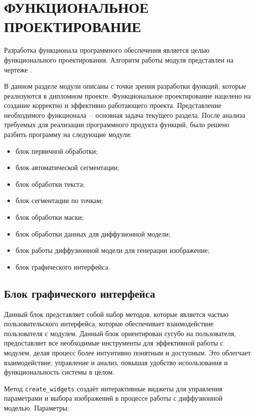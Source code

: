 \section{ФУНКЦИОНАЛЬНОЕ ПРОЕКТИРОВАНИЕ}
\label{sec:func}

Разработка функционала программного обеспечения является целью 
функционального проектирования. Алгоритм работы модуля представлен на чертеже \blockScheme.

В данном разделе модули описаны с точки зрения разработки функций, которые реализуются в
дипломном проекте. Функциональное проектирование нацелено на создание корректно и
эффективно работающего проекта. Представление необходимого функционала~-- основная задача текущего раздела. После анализа требуемых для реализации программного продукта
функций, было решено разбить программу на следующие модули:

\begin{itemize}
    \item блок первичной обработки;
    \item блок автоматической сегментации;
    \item блок обработки текста;
    \item блок сегментации по точкам;
    \item блок обработки маски;
    \item блок обработки данных для диффузионной модели;
    \item блок работы диффузионной модели для генерации изображение;
    \item блок графического интерфейса.
\end{itemize}

\subsection{Блок графического интерфейса}

Данный блок представляет собой набор методов, которые является частью пользовательского интерфейса, которые обеспечивает взаимодействие пользователя с модулем. Данный блок ориентирован сугубо на пользователя, предоставляет все необходимые инструменты для эффективной работы с модулем, делая процесс более интуитивно понятным и доступным. Это облегчает взаимодействие, управление и анализ, повышая удобство использования и функциональность системы в целом.

Метод \lstinline{create_widgets} создаёт интерактивные виджеты для управления параметрами и выбора изображений в процессе работы с диффузионной моделью. Параметры:

